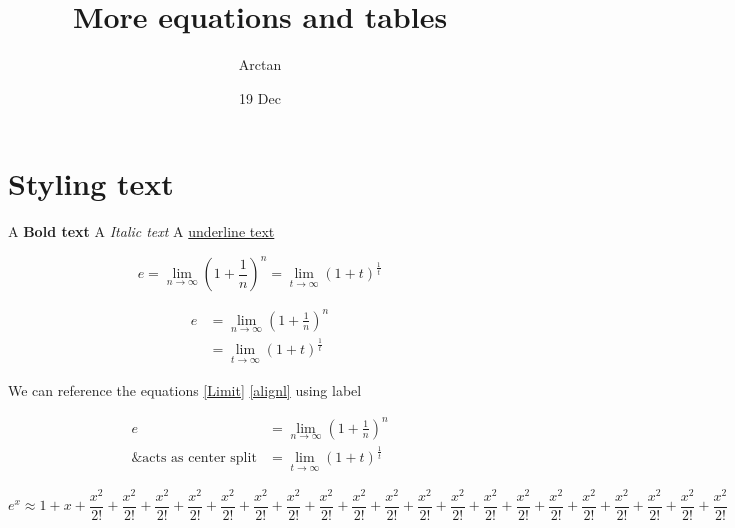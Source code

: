 \documentclass{article}
\title{More equations and tables}
\author{Arctan}
\date{19 Dec}
\begin{document}
\maketitle

\section{Styling text}

A \textbf{Bold text}
A \textit{Italic text}
A \underline{underline text}

    \begin{equation}
    \label{Limit}
        e = \lim_{n\to\infty}\left(1+\frac{1}{n}\right)^n
          = \lim_{t\to\infty}(1+t)^\frac{1}{t}
    \end{equation}

    \begin{align}
    \label{alignl}
        e& = \lim_{n\to\infty}\left(1+\frac{1}{n}\right)^n \\ 
          &= \lim_{t\to\infty}(1+t)^\frac{1}{t}
    \end{align}

    We can reference the equations \ref{Limit} \ref{alignl} using label 

    \begin{equation}
    \begin{split}
        e &= \lim_{n\to\infty}\left(1+\frac{1}{n}\right)^n \\
        \text{\& acts as center split}  &= \lim_{t\to\infty}(1+t)^\frac{1}{t}
    \end{split} 
    \end{equation}

    \begin{equation}
        e^x \approx 1 + x + \frac{x^2}{2!} + \frac{x^2}{2!}+ \frac{x^2}{2!}+ \frac{x^2}{2!}+ \frac{x^2}{2!}+ \frac{x^2}{2!}+ \frac{x^2}{2!}+ \frac{x^2}{2!}+ \frac{x^2}{2!}+ \frac{x^2}{2!}+ \frac{x^2}{2!}+ \frac{x^2}{2!}+ \frac{x^2}{2!}+ \frac{x^2}{2!}+ \frac{x^2}{2!}+ \frac{x^2}{2!}+ \frac{x^2}{2!}+ \frac{x^2}{2!}+ \frac{x^2}{2!}+ \frac{x^2}{2!}
    \end{equation}
\end{document}
